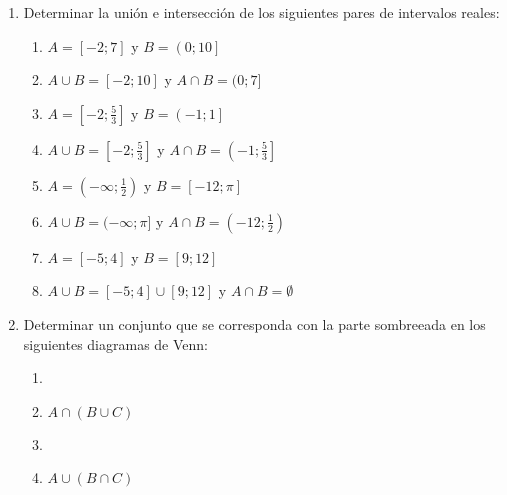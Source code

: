 \documentclass[a4paper]{article}
\newcommand{\answer}{\item[**]}
\newcommand{\exercise}{\item}
\newcommand{\intersec}{\cap}
\newcommand{\union}{\cup}
\newcommand{\symdiff}{\Delta}
\newcommand{\compl}[1]{\overline{#1}}
\newcommand{\df}[2]{\displaystyle\frac{#1}{#2}}
\newcommand{\img}[2]{ \begin{minipage}[t]{\linewidth} \raisebox{-\height}{\texttt{[image: \#2]}} \end{minipage} } %
\begin{document}
\begin{enumerate}
\begin{multicols}{3}
\begin{enumerate} [label=(\alph*)]
		\item $(A \setminus B) \union C$
		\answer $\{2,3,4\}$

		\item $(A \union B) \setminus (C \intersec D)$
		\answer \{1,2,3,\{2,3\}\}

		\item $A \symdiff C$
		\answer $\{1,4\}$

		\item $\compl{A}$ considerando el universo $U=\mathbb{N}$
		\answer $\{ x \in \mathbb{N} ~|~ x \geq 4 \}= \{4,5,6,7,8,9,10,11, \cdots \}$

	\end{enumerate}
	\end{multicols}

	\exercise Determinar la unión e intersección de los siguientes pares de intervalos reales: 
	\begin{multicols}{3}
	\begin{enumerate} [label=(\alph*)]
		\item $A=\left[-2;7\right]$  y $B=\left(0;10\right]$
		\answer $A \union B = [-2;10]$ y $A \intersec B = (0;7]$

		\item $A=\left[-2;\df{5}{3}\right]$  y $B=\left(-1;1\right]$
		\answer $A \union B = \left[-2;\df{5}{3}\right]$ y $A \intersec B = \left(-1;\df{5}{3}\right]$

		\item $A=\left(-\infty;\df{1}{2}\right)$  y $B=\left[-12;\pi \right]$
		\answer $A \union B = (-\infty;\pi]$ y $A \intersec B = \left(-12;\df{1}{2}\right)$

		\item $A=\left[-5;4\right]$  y $B=\left[9;12\right]$
		\answer $A \union B = [-5;4] \union [9;12]$ y $A \intersec B = \emptyset$


	\end{enumerate}
	\end{multicols}

	\exercise Determinar un conjunto que se corresponda con la parte sombreeada en los siguientes diagramas de Venn:
	\begin{multicols}{2}
	\begin{enumerate} [label=(\alph*)]
		\item \img{4cm}{img/conj1.png}
		\answer $A \intersec (B \union C)$

		\item \img{4cm}{img/conj3.png}
		\answer $A \union (B \intersec C)$


\end{enumerate}
\end{multicols}
\end{enumerate}
\end{document}
